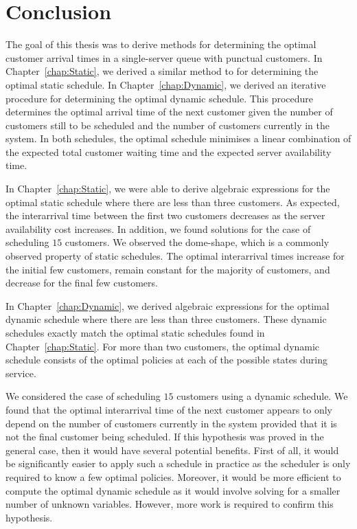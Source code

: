\chapter{Conclusion}
The goal of this thesis was to derive methods for determining the optimal customer arrival times in a single-server queue with punctual customers. In Chapter~\ref{chap:Static}, we derived a similar method to \citet{Pegden} for determining the optimal static schedule. In Chapter~\ref{chap:Dynamic}, we derived an iterative procedure for determining the optimal dynamic schedule. This procedure determines the optimal arrival time of the next customer given the number of customers still to be scheduled and the number of customers currently in the system. In both schedules, the optimal schedule minimises a linear combination of the expected total customer waiting time and the expected server availability time.

In Chapter~\ref{chap:Static}, we were able to derive algebraic expressions for the optimal static schedule where there are less than three customers. As expected, the interarrival time between the first two customers decreases as the server availability cost increases. In addition, we found solutions for the case of scheduling $15$ customers. We observed the dome-shape, which is a commonly observed property of static schedules. The optimal interarrival times increase for the initial few customers, remain constant for the majority of customers, and decrease for the final few customers.

In Chapter~\ref{chap:Dynamic}, we derived algebraic expressions for the optimal dynamic schedule where there are less than three customers. These dynamic schedules exactly match the optimal static schedules found in Chapter~\ref{chap:Static}. For more than two customers, the optimal dynamic schedule consists of the optimal policies at each of the possible states during service.

We considered the case of scheduling $15$ customers using a dynamic schedule. We found that the optimal interarrival time of the next customer appears to only depend on the number of customers currently in the system provided that it is not the final customer being scheduled. If this hypothesis was proved in the general case, then it would have several potential benefits. First of all, it would be significantly easier to apply such a schedule in practice as the scheduler is only required to know a few optimal policies. Moreover, it would be more efficient to compute the optimal dynamic schedule as it would involve solving for a smaller number of unknown variables. However, more work is required to confirm this hypothesis.

